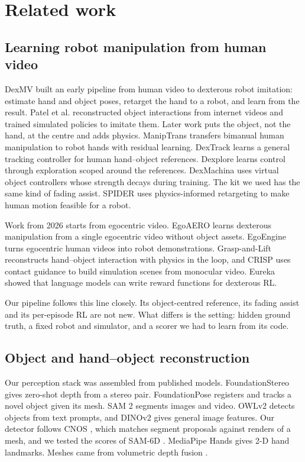 \documentclass[11pt]{article}
\begin{document}
\section{Related work}
\subsection{Learning robot manipulation from human video}
DexMV \cite{r1} built an early pipeline from human video to dexterous robot imitation: estimate hand and object poses, retarget the hand to a robot, and learn from the result. Patel et al. \cite{r2} reconstructed object interactions from internet videos and trained simulated policies to imitate them. Later work puts the object, not the hand, at the centre and adds physics. ManipTrans \cite{r3} transfers bimanual human manipulation to robot hands with residual learning. DexTrack \cite{r4} learns a general tracking controller for human hand–object references. Dexplore \cite{r15} learns control through exploration scoped around the references. DexMachina \cite{r5} uses virtual object controllers whose strength decays during training. The kit we used has the same kind of fading assist. SPIDER \cite{r6} uses physics-informed retargeting to make human motion feasible for a robot.

Work from 2026 starts from egocentric video. EgoAERO \cite{r16} learns dexterous manipulation from a single egocentric video without object assets. EgoEngine \cite{r17} turns egocentric human videos into robot demonstrations. Grasp-and-Lift \cite{r18} reconstructs hand–object interaction with physics in the loop, and CRISP \cite{r19} uses contact guidance to build simulation scenes from monocular video. Eureka \cite{r20} showed that language models can write reward functions for dexterous RL.

Our pipeline follows this line closely. Its object-centred reference, its fading assist and its per-episode RL are not new. What differs is the setting: hidden ground truth, a fixed robot and simulator, and a scorer we had to learn from its code.

\subsection{Object and hand–object reconstruction}
Our perception stack was assembled from published models. FoundationStereo \cite{r21} gives zero-shot depth from a stereo pair. FoundationPose \cite{r22} registers and tracks a novel object given its mesh. SAM 2 \cite{r23} segments images and video. OWLv2 \cite{r24} detects objects from text prompts, and DINOv2 \cite{r25} gives general image features. Our detector follows CNOS \cite{r26}, which matches segment proposals against renders of a mesh, and we tested the scores of SAM-6D \cite{r27}. MediaPipe Hands \cite{r28} gives 2-D hand landmarks. Meshes came from volumetric depth fusion \cite{r29}.
\end{document}
